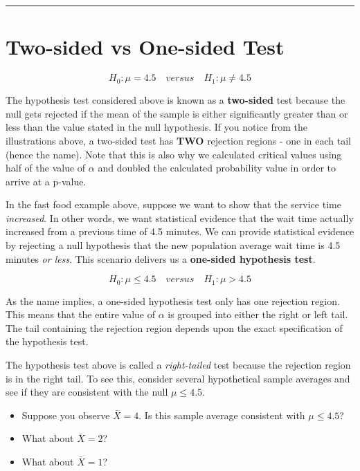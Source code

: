 \documentclass[
]{book}
\begin{document}
\begin{center}\rule{0.5\linewidth}{0.5pt}\end{center}

\section{Two-sided vs One-sided Test}\label{two-sided-vs-one-sided-test}

\[H_0:\mu=4.5 \quad versus \quad H_1:\mu\neq 4.5\]

The hypothesis test considered above is known as a \textbf{two-sided} test because the null gets rejected if the mean of the sample is either significantly greater than or less than the value stated in the null hypothesis. If you notice from the illustrations above, a two-sided test has \textbf{TWO} rejection regions - one in each tail (hence the name). Note that this is also why we calculated critical values using half of the value of \(\alpha\) and doubled the calculated probability value in order to arrive at a p-value.

In the fast food example above, suppose we want to show that the service time \emph{increased}. In other words, we want statistical evidence that the wait time actually increased from a previous time of 4.5 minutes. We can provide statistical evidence by rejecting a null hypothesis that the new population average wait time is 4.5 minutes \emph{or less}. This scenario delivers us a \textbf{one-sided hypothesis test}.

\[H_0:\mu \leq 4.5 \quad versus \quad H_1:\mu> 4.5\]

As the name implies, a one-sided hypothesis test only has one rejection region. This means that the entire value of \(\alpha\) is grouped into either the right or left tail. The tail containing the rejection region depends upon the exact specification of the hypothesis test.

The hypothesis test above is called a \emph{right-tailed} test because the rejection region is in the right tail. To see this, consider several hypothetical sample averages and see if they are consistent with the null \(\mu \leq 4.5\).

\begin{itemize}
\item
  Suppose you observe \(\bar{X}=4\). Is this sample average consistent with \(\mu \leq 4.5\)?
\item
  What about \(\bar{X}=2\)?
\item
  What about \(\bar{X}=1\)?
\end{itemize}
\end{document}
